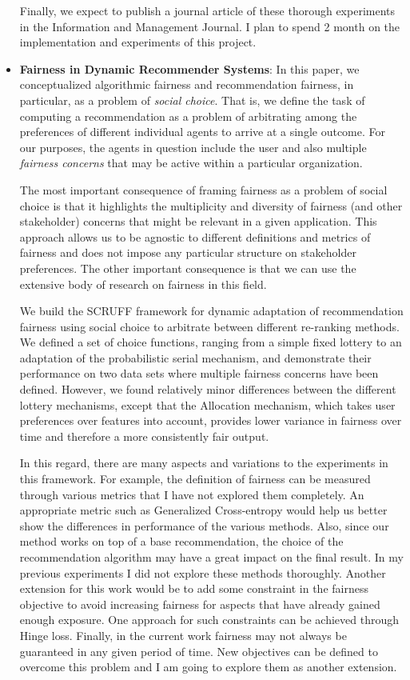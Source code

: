 \begin{itemize}
    Finally, we expect to publish a journal article of these thorough experiments in the Information and Management Journal. I plan to spend 2 month on the implementation and experiments of this project.
    
    \item \textbf{Fairness in Dynamic Recommender Systems}: In this paper, we conceptualized algorithmic fairness and recommendation fairness, in particular, as a problem of \textit{social choice}. That is, we define the task of computing a recommendation as a problem of arbitrating among the preferences of different individual agents to arrive at a single outcome. For our purposes, the agents in question include the user and also multiple \textit{fairness concerns} that may be active within a particular organization.
    
    The most important consequence of framing fairness as a problem of social choice is that it highlights the multiplicity and diversity of fairness (and other stakeholder) concerns that might be relevant in a given application. This approach allows us to be agnostic to different definitions and metrics of fairness and does not impose any particular structure on stakeholder preferences. The other important consequence is that we can use the extensive body of research on fairness in this field.
    
    We build the SCRUFF framework for dynamic adaptation of recommendation fairness using social choice to arbitrate between different re-ranking methods. We defined a set of choice functions, ranging from a simple fixed lottery to an adaptation of the probabilistic serial mechanism, and demonstrate their performance on two data sets where multiple fairness concerns have been defined. However, we found relatively minor differences between the different lottery mechanisms, except that the Allocation mechanism, which takes user preferences over features into account, provides lower variance in fairness over time and therefore a more consistently fair output.
    
    In this regard, there are many aspects and variations to the experiments in this framework. For example, the definition of fairness can be measured through various metrics that I have not explored them completely. An appropriate metric such as Generalized Cross-entropy would help us better show the differences in performance of the various methods. Also, since our method works on top of a base recommendation, the choice of the recommendation algorithm may have a great impact on the final result. In my previous experiments I did not explore these methods thoroughly. Another extension for this work would be to add some constraint in the fairness objective to avoid increasing fairness for aspects that have already gained enough exposure. One approach for such constraints can be achieved through Hinge loss. Finally, in the current work fairness may not always be guaranteed in any given period of time. New objectives can be defined to overcome this problem and I am going to explore them as another extension.
    

\end{itemize}
